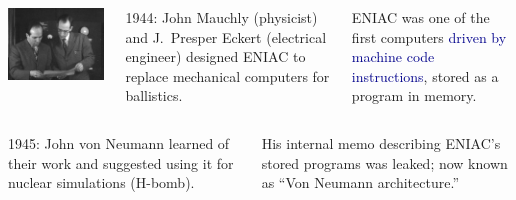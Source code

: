 \documentclass[aspectratio=169]{beamer}
\begin{document}
\begin{frame}{}
\vspace{0.5 cm}

\begin{columns}
\includegraphics[width=\linewidth]{presper-and-mauchly.jpg}

1944: John Mauchly (physicist) and J.\ Presper Eckert (electrical engineer) designed ENIAC to replace mechanical computers for ballistics.

\vspace{0.25 cm}
ENIAC was one of the first computers \textcolor{darkblue}{driven by machine code instructions}, stored as a program in memory.
\end{columns}

\vspace{0.25 cm}
\begin{columns}
1945: John von Neumann learned of their work and suggested using it for nuclear simulations (H-bomb).

\vspace{0.25 cm}
His internal memo describing ENIAC's stored programs was leaked; now known as ``Von Neumann architecture.''


\end{columns}
\end{frame}
\end{document}
